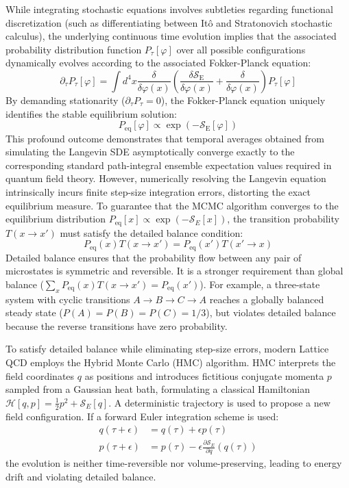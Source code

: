 While integrating stochastic equations involves subtleties regarding functional discretization (such as differentiating between It\^o and Stratonovich stochastic calculus), the underlying continuous time evolution implies that the associated probability distribution function $P_\tau[\varphi]$ over all possible configurations dynamically evolves according to the associated Fokker-Planck equation:
\begin{equation}
\partial_\tau P_\tau[\varphi] = \int d^4x \frac{\delta}{\delta \varphi(x)} \left( \frac{\delta \mathcal{S}_{\mathrm{E}}}{\delta \varphi(x)} + \frac{\delta}{\delta \varphi(x)} \right) P_\tau[\varphi]
\label{eq:fokker_planck}
\end{equation}
By demanding stationarity ($\partial_\tau P_\tau = 0$), the Fokker-Planck equation uniquely identifies the stable equilibrium solution:
\begin{equation}
P_{\mathrm{eq}}[\varphi] \propto \exp\left(-\mathcal{S}_{\mathrm{E}}[\varphi]\right)
\end{equation}
This profound outcome demonstrates that temporal averages obtained from simulating the Langevin SDE asymptotically converge exactly to the corresponding standard path-integral ensemble expectation values required in quantum field theory.
However, numerically resolving the Langevin equation intrinsically incurs finite step-size integration errors, distorting the exact equilibrium measure. To guarantee that the MCMC algorithm converges to the equilibrium distribution $P_{\text{eq}}[x] \propto \exp(-\mathcal{S}_E[x])$, the transition probability $T(x \to x')$ must satisfy the detailed balance condition:
\begin{equation}
P_{\text{eq}}(x) T(x \to x') = P_{\text{eq}}(x') T(x' \to x)
\end{equation}
Detailed balance ensures that the probability flow between any pair of microstates is symmetric and reversible. It is a stronger requirement than global balance ($\sum_x P_{\text{eq}}(x) T(x \to x') = P_{\text{eq}}(x')$). For example, a three-state system with cyclic transitions $A \to B \to C \to A$ reaches a globally balanced steady state ($P(A) = P(B) = P(C) = 1/3$), but violates detailed balance because the reverse transitions have zero probability.

To satisfy detailed balance while eliminating step-size errors, modern Lattice QCD employs the Hybrid Monte Carlo (HMC) algorithm. HMC interprets the field coordinates $q$ as positions and introduces fictitious conjugate momenta $p$ sampled from a Gaussian heat bath, formulating a classical Hamiltonian $\mathcal{H}[q, p] = \frac{1}{2}p^2 + \mathcal{S}_E[q]$. A deterministic trajectory is used to propose a new field configuration. If a forward Euler integration scheme is used:
\begin{align}
    q(\tau + \epsilon) &= q(\tau) + \epsilon p(\tau) \\
    p(\tau + \epsilon) &= p(\tau) - \epsilon \frac{\partial \mathcal{S}_E}{\partial q}(q(\tau))
\end{align}
the evolution is neither time-reversible nor volume-preserving, leading to energy drift and violating detailed balance.

